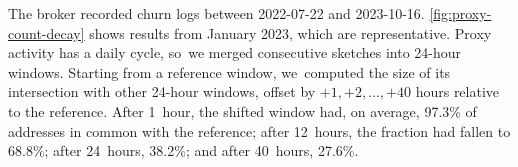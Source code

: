 \documentclass[letterpaper,twocolumn]{article}
\begin{document}
The broker recorded churn logs between
\mbox{2022-07-22} and
\mbox{2023-10-16}.
\autoref{fig:proxy-count-decay}
shows results from January 2023,
which are representative.
Proxy activity has a daily cycle,
so~we merged consecutive sketches into 24-hour windows.
Starting from a reference window,
we~computed the size of its intersection with other 24-hour windows,
offset by \(+1, +2, \ldots, +40\) hours relative to the reference.
After 1~hour, the shifted window had, on average,
97.3\% of addresses in common with the reference;
after 12~hours, the fraction had fallen to 68.8\%;
after 24~hours, 38.2\%;
and after 40~hours, 27.6\%.
\end{document}

